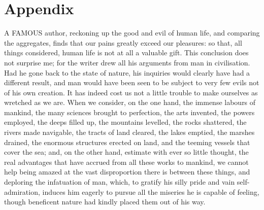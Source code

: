 \documentclass[12pt]{report}
\begin{document}
\chapter*{Appendix}\label{appendix}
A FAMOUS author, reckoning up the good and evil of human life, and comparing the aggregates, finds that our pains greatly exceed our pleasures: so that, all things considered, human life is not at all a valuable gift. This conclusion does not surprise me; for the writer drew all his arguments from man in civilisation. Had he gone back to the state of nature, his inquiries would clearly have had a different result, and man would have been seen to be subject to very few evils not of his own creation. It has indeed cost us not a little trouble to make ourselves as wretched as we are. When we consider, on the one hand, the immense labours of mankind, the many sciences brought to perfection, the arts invented, the powers employed, the deeps filled up, the mountains levelled, the rocks shattered, the rivers made navigable, the tracts of land cleared, the lakes emptied, the marshes drained, the enormous structures erected on land, and the teeming vessels that cover the sea; and, on the other hand, estimate with ever so little thought, the real advantages that have accrued from all these works to mankind, we cannot help being amazed at the vast disproportion there is between these things, and deploring the infatuation of man, which, to gratify his silly pride and vain self-admiration, induces him eagerly to pursue all the miseries he is capable of feeling, though beneficent nature had kindly placed them out of his way.
\end{document}
